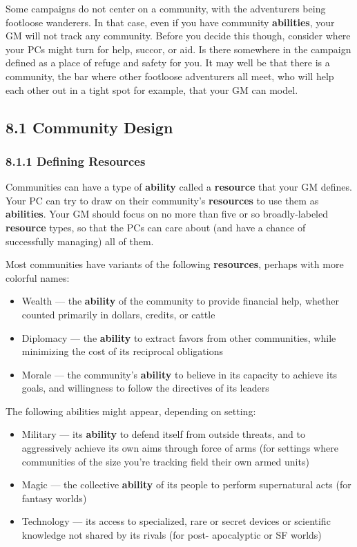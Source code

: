 \documentclass[
]{article}
\providecommand{\tightlist}{%
  \setlength{\itemsep}{0pt}\setlength{\parskip}{0pt}}
\begin{document}
Some campaigns do not center on a community, with the adventurers being
footloose wanderers. In that case, even if you have community
\textbf{abilities}, your GM will not track any community. Before you
decide this though, consider where your PCs might turn for help, succor,
or aid. Is there somewhere in the campaign defined as a place of refuge
and safety for you. It may well be that there is a community, the bar
where other footloose adventurers all meet, who will help each other out
in a tight spot for example, that your GM can model.

\hypertarget{community-design}{%
\subsection{8.1 Community Design}\label{community-design}}

\hypertarget{defining-resources}{%
\subsubsection{8.1.1 Defining Resources}\label{defining-resources}}

Communities can have a type of \textbf{ability} called a
\textbf{resource} that your GM defines. Your PC can try to draw on their
community's \textbf{resources} to use them as \textbf{abilities}. Your
GM should focus on no more than five or so broadly-labeled
\textbf{resource} types, so that the PCs can care about (and have a
chance of successfully managing) all of them.

Most communities have variants of the following \textbf{resources},
perhaps with more colorful names:

\begin{itemize}
\tightlist
\item
  Wealth --- the \textbf{ability} of the community to provide financial
  help, whether counted primarily in dollars, credits, or cattle
\item
  Diplomacy --- the \textbf{ability} to extract favors from other
  communities, while minimizing the cost of its reciprocal obligations
\item
  Morale --- the community's \textbf{ability} to believe in its capacity
  to achieve its goals, and willingness to follow the directives of its
  leaders
\end{itemize}

The following abilities might appear, depending on setting:

\begin{itemize}
\tightlist
\item
  Military --- its \textbf{ability} to defend itself from outside
  threats, and to aggressively achieve its own aims through force of
  arms (for settings where communities of the size you're tracking field
  their own armed units)
\item
  Magic --- the collective \textbf{ability} of its people to perform
  supernatural acts (for fantasy worlds)
\item
  Technology --- its access to specialized, rare or secret devices or
  scientific knowledge not shared by its rivals (for post- apocalyptic
  or SF worlds)
\end{itemize}
\end{document}
